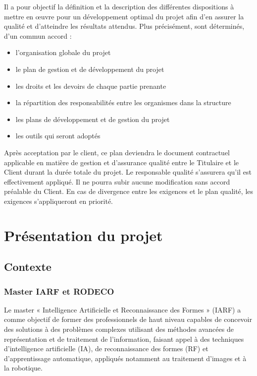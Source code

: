 \documentclass[10pt,a4paper]{article}
\begin{document}
Il a pour objectif la définition et la description des différentes dispositions à mettre en œuvre pour un développement optimal du projet afin d’en assurer la qualité et d’atteindre les résultats attendus. Plus précisément, sont déterminés, d’un commun accord :
\begin{itemize}
\item l’organisation globale du projet 
\item le plan de gestion et de développement du projet
\item les droits et les devoirs de chaque partie prenante
\item la répartition des responsabilités entre les organismes dans la structure
\item les plans de développement et de gestion du projet
\item les outils qui seront adoptés 
\end{itemize}

Après acceptation par le client, ce plan deviendra le document contractuel applicable en matière de gestion et d’assurance qualité entre le Titulaire et le Client durant la durée totale du projet. Le responsable qualité s’assurera qu’il est effectivement appliqué. Il ne pourra subir aucune modification sans accord préalable du Client. En cas de divergence entre les exigences et le plan qualité, les exigences s’appliqueront en priorité.


\section{Présentation du projet}
\label{sec:presentation}

\subsection{Contexte}

\subsubsection{Master IARF et RODECO}

Le master « Intelligence Artificielle et Reconnaissance des Formes » (IARF) a comme objectif de former des professionnels de haut niveau capables de concevoir des solutions à des problèmes complexes utilisant des méthodes avancées de représentation et de traitement de l’information, faisant appel à des techniques d’intelligence artificielle (IA), de reconnaissance des formes (RF) et d’apprentissage automatique, appliqués notamment au traitement d’images et à la robotique. 
\end{document}
